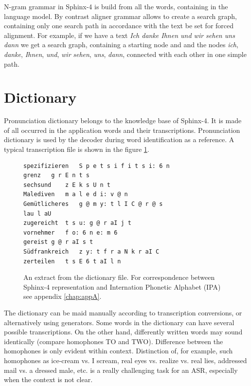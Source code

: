 N-gram grammar in Sphinx-4 is build from all the words, containing in the
language model. By contrast aligner grammar allows to create a search graph,
containing only one search path in accordance with the text be set for forced
alignment. For example, if we have a text \textit {Ich danke Ihnen und wir
sehen uns dann} we get a search graph, containing  a starting node and and the
nodes \textit{ich}, \textit {danke}, \textit{Ihnen}, \textit{und}, \textit {wir}
\textit {sehen}, \textit{uns}, \textit {dann}, connected with each other in one
simple path.
\section {Dictionary} 

Pronunciation dictionary belongs to the knowledge base of Sphinx-4. It is made
of all occurred in the application words and their transcriptions. Pronunciation dictionary is used by the decoder 
during word identification as a reference. 
A typical transcription file is shown in the figure \ref {fig:dic}.
\newline
\begin{figure}[htbp]
{}
%  
%  
\begin{lstlisting}[frame=single]
spezifizieren	S p e t s i f i t s i: 6 n  
grenz	g r E n t s 
sechsund	z E k s U n t
Malediven	m a l e d i: v @ n
Gemütlicheres	g @ m y: t l I C @ r @ s
lau	l aU
zugereicht	t s u: g @ r aI j t
vornehmer	f o: 6 n e: m 6
gereist	g @ r aI s t
Südfrankreich	z y: t f r a N k r aI C
zerteilen	t s E 6 t aI l n
\end{lstlisting}
 \caption{An extract from the dictionary file. For correspondence between
 Sphinx-4 representation and Internation Phonetic Alphabet (IPA) see appendix
 \ref{chap:appA}.
 }
  \label{fig:dic}
\end {figure}
\newline
The dictionary can be maid manually according to transcription conversions, or
alternatively using generators. Some words in the dictionary can have several possible transcriptions. On the other hand, differently written words 
may sound identically (compare homophones TO and TWO). Difference between the homophones is only evident within context. Distinction of, for 
example, such homophones as ice-cream vs. I scream, real eyes vs. realize vs. real lies, addressed mail vs. a dressed male, etc. is a really 
challenging task for an ASR, especially when the context is not clear.

